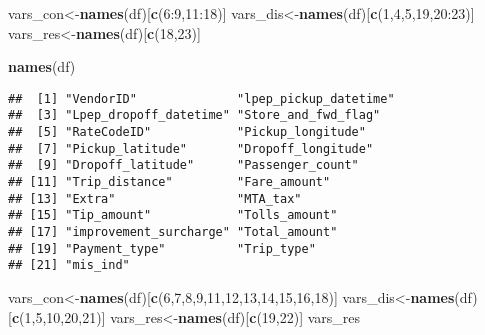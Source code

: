 \documentclass[]{article}
\newenvironment{Shaded}{\begin{snugshade}}{\end{snugshade}}
\newcommand{\KeywordTok}[1]{\textcolor[rgb]{0.13,0.29,0.53}{\textbf{{#1}}}}
\newcommand{\DecValTok}[1]{\textcolor[rgb]{0.00,0.00,0.81}{{#1}}}
\newcommand{\NormalTok}[1]{{#1}}
\begin{document}
\begin{Shaded}
\begin{Highlighting}[]
\NormalTok{vars_con<-}\KeywordTok{names}\NormalTok{(df)[}\KeywordTok{c}\NormalTok{(}\DecValTok{6}\NormalTok{:}\DecValTok{9}\NormalTok{,}\DecValTok{11}\NormalTok{:}\DecValTok{18}\NormalTok{)]}
\NormalTok{vars_dis<-}\KeywordTok{names}\NormalTok{(df)[}\KeywordTok{c}\NormalTok{(}\DecValTok{1}\NormalTok{,}\DecValTok{4}\NormalTok{,}\DecValTok{5}\NormalTok{,}\DecValTok{19}\NormalTok{,}\DecValTok{20}\NormalTok{:}\DecValTok{23}\NormalTok{)]}
\NormalTok{vars_res<-}\KeywordTok{names}\NormalTok{(df)[}\KeywordTok{c}\NormalTok{(}\DecValTok{18}\NormalTok{,}\DecValTok{23}\NormalTok{)]}

\KeywordTok{names}\NormalTok{(df)}
\end{Highlighting}
\end{Shaded}

\begin{verbatim}
##  [1] "VendorID"              "lpep_pickup_datetime" 
##  [3] "Lpep_dropoff_datetime" "Store_and_fwd_flag"   
##  [5] "RateCodeID"            "Pickup_longitude"     
##  [7] "Pickup_latitude"       "Dropoff_longitude"    
##  [9] "Dropoff_latitude"      "Passenger_count"      
## [11] "Trip_distance"         "Fare_amount"          
## [13] "Extra"                 "MTA_tax"              
## [15] "Tip_amount"            "Tolls_amount"         
## [17] "improvement_surcharge" "Total_amount"         
## [19] "Payment_type"          "Trip_type"            
## [21] "mis_ind"
\end{verbatim}

\begin{Shaded}
\begin{Highlighting}[]
\NormalTok{vars_con<-}\KeywordTok{names}\NormalTok{(df)[}\KeywordTok{c}\NormalTok{(}\DecValTok{6}\NormalTok{,}\DecValTok{7}\NormalTok{,}\DecValTok{8}\NormalTok{,}\DecValTok{9}\NormalTok{,}\DecValTok{11}\NormalTok{,}\DecValTok{12}\NormalTok{,}\DecValTok{13}\NormalTok{,}\DecValTok{14}\NormalTok{,}\DecValTok{15}\NormalTok{,}\DecValTok{16}\NormalTok{,}\DecValTok{18}\NormalTok{)] }
\NormalTok{vars_dis<-}\KeywordTok{names}\NormalTok{(df)[}\KeywordTok{c}\NormalTok{(}\DecValTok{1}\NormalTok{,}\DecValTok{5}\NormalTok{,}\DecValTok{10}\NormalTok{,}\DecValTok{20}\NormalTok{,}\DecValTok{21}\NormalTok{)]}
\NormalTok{vars_res<-}\KeywordTok{names}\NormalTok{(df)[}\KeywordTok{c}\NormalTok{(}\DecValTok{19}\NormalTok{,}\DecValTok{22}\NormalTok{)]}
\NormalTok{vars_res}
\end{Highlighting}
\end{Shaded}
\end{document}
